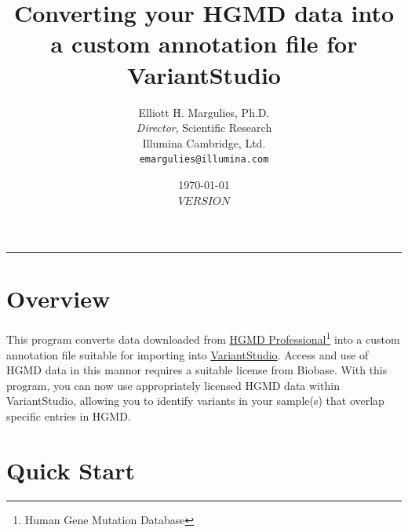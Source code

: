 \documentclass[11pt,titlepage,a4paper]{article}
\newcommand{\vsurl}{https://www.illumina.com/clinical/clinical_informatics/illumina-variantstudio.ilmn}
\newcommand{\hgmdurl}{http://www.biobase-international.com/product/hgmd}
\begin{document}

\title{Converting your HGMD data into a custom annotation file for VariantStudio}

\author{Elliott H. Margulies, Ph.D.\\
  \emph{Director}, Scientific Research\\
  Illumina Cambridge, Ltd.  \vspace{0.5em}  \\
  \texttt{emargulies@illumina.com} }

\date{\today \\ $VERSION$ }

\maketitle


\tableofcontents

\vspace{1em}
\hrule

\section{Overview}

This program converts data downloaded from \href{\hgmdurl}{HGMD Professional}\footnote{Human Gene Mutation Database} into a custom annotation file suitable for importing into \href{\vsurl}{VariantStudio}. Access and use of HGMD data in this mannor requires a suitable license from Biobase. With this program, you can now use appropriately licensed HGMD data within VariantStudio, allowing you to identify variants in your sample(s) that overlap specific entries in HGMD.

\section{Quick Start}
\end{document}
